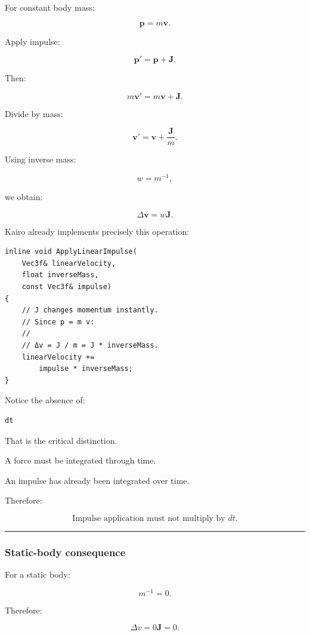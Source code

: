 For constant body mass:

\[
\mathbf p=m\mathbf v.
\]

Apply impulse:

\[
\mathbf p'
=
\mathbf p+\mathbf J.
\]

Then:

\[
m\mathbf v'
=
m\mathbf v+\mathbf J.
\]

Divide by mass:

\[
\boxed{
\mathbf v'
=
\mathbf v+
\frac{\mathbf J}{m}.
}
\]

Using inverse mass:

\[
w=m^{-1},
\]

we obtain:

\[
\boxed{
\Delta\mathbf v
=
w\mathbf J.
}
\]

Kairo already implements precisely this operation:

\begin{verbatim}
inline void ApplyLinearImpulse(
    Vec3f& linearVelocity,
    float inverseMass,
    const Vec3f& impulse)
{
    // J changes momentum instantly.
    // Since p = m v:
    //
    // Δv = J / m = J * inverseMass.
    linearVelocity +=
        impulse * inverseMass;
}
\end{verbatim}

Notice the absence of:

\begin{verbatim}
dt
\end{verbatim}

That is the critical distinction.

A force must be integrated through time.

An impulse has already been integrated over time.

Therefore:

\[
\boxed{
\text{Impulse application must not multiply by }dt.
}
\]

\begin{center}\rule{0.5\linewidth}{0.5pt}\end{center}

\subsubsection{Static-body consequence}\label{static-body-consequence}

For a static body:

\[
m^{-1}=0.
\]

Therefore:

\[
\Delta v
=
0\mathbf J
=
0.
\]

